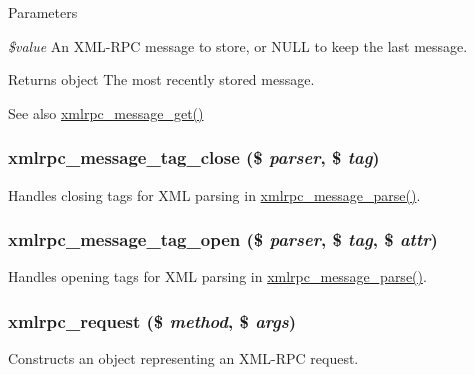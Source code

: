 \begin{DoxyParams}{Parameters}
\item[{\em \$value}]An XML-\/RPC message to store, or NULL to keep the last message.\end{DoxyParams}
\begin{DoxyReturn}{Returns}
object The most recently stored message.
\end{DoxyReturn}
\begin{DoxySeeAlso}{See also}
\hyperlink{xmlrpc_8inc_a8ee9baa0e35c9f75da4705403ec1c502}{xmlrpc\_\-message\_\-get()} 
\end{DoxySeeAlso}
\hypertarget{xmlrpc_8inc_aee4cd82346eac26c40587fc89cddb02f}{
\subsubsection[{xmlrpc\_\-message\_\-tag\_\-close}]{\setlength{\rightskip}{0pt plus 5cm}xmlrpc\_\-message\_\-tag\_\-close (\$ {\em parser}, \/  \$ {\em tag})}}
\label{xmlrpc_8inc_aee4cd82346eac26c40587fc89cddb02f}
Handles closing tags for XML parsing in \hyperlink{xmlrpc_8inc_ad105844dad0a30254611d32284350dc4}{xmlrpc\_\-message\_\-parse()}. \hypertarget{xmlrpc_8inc_af6f1ebfc3ddbd60f36e1058b1cb257de}{
\subsubsection[{xmlrpc\_\-message\_\-tag\_\-open}]{\setlength{\rightskip}{0pt plus 5cm}xmlrpc\_\-message\_\-tag\_\-open (\$ {\em parser}, \/  \$ {\em tag}, \/  \$ {\em attr})}}
\label{xmlrpc_8inc_af6f1ebfc3ddbd60f36e1058b1cb257de}
Handles opening tags for XML parsing in \hyperlink{xmlrpc_8inc_ad105844dad0a30254611d32284350dc4}{xmlrpc\_\-message\_\-parse()}. \hypertarget{xmlrpc_8inc_a21b3f792f935fd99fc444c82493aaca9}{
\subsubsection[{xmlrpc\_\-request}]{\setlength{\rightskip}{0pt plus 5cm}xmlrpc\_\-request (\$ {\em method}, \/  \$ {\em args})}}
\label{xmlrpc_8inc_a21b3f792f935fd99fc444c82493aaca9}
Constructs an object representing an XML-\/RPC request.


